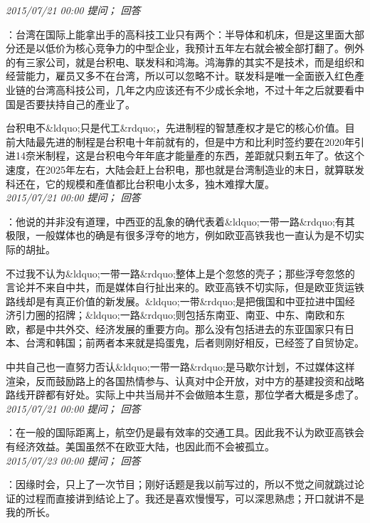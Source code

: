 \documentclass[twocolumn]{ctexart}
\begin{document}
\textit{\hfill\noindent\small 2015/07/21 00:00 提问； 回答}

：台湾在国际上能拿出手的高科技工业只有两个：半导体和机床，但是这里面大部分还是以低价为核心竞争力的中型企业，我预计五年左右就会被全部打翻了。例外的有三家公司，就是台积电、联发科和鸿海。鸿海靠的其实不是技术，而是组织和经营能力，雇员又多不在台湾，所以可以忽略不计。联发科是唯一全面嵌入红色產业链的台湾高科技公司，几年之内应该还有不少成长余地，不过十年之后就要看中国是否要扶持自己的產业了。

台积电不\&ldquo;只是代工\&rdquo;，先进制程的智慧產权才是它的核心价值。目前大陆最先进的制程是台积电十年前就有的，但是中方和比利时签约要在2020年引进14奈米制程，这是台积电今年年底才能量產的东西，差距就只剩五年了。依这个速度，在2025年左右，大陆会赶上台积电，那也就是台湾制造业的末日，就算联发科还在，它的规模和產值都比台积电小太多，独木难撑大厦。\\

\textit{\hfill\noindent\small 2015/07/21 00:00 提问； 回答}

：他说的并非没有道理，中西亚的乱象的确代表着\&ldquo;一带一路\&rdquo;有其极限，一般媒体也的确是有很多浮夸的地方，例如欧亚高铁我也一直认为是不切实际的胡扯。

不过我不认为\&ldquo;一带一路\&rdquo;整体上是个忽悠的壳子；那些浮夸忽悠的言论并不来自中共，而是媒体自行扯出来的。欧亚高铁不切实际，但是欧亚货运铁路线却是有真正价值的新发展。\&ldquo;一带\&rdquo;是把俄国和中亚拉进中国经济引力圈的招牌；\&ldquo;一路\&rdquo;则包括东南亚、南亚、中东、南欧和东欧，都是中共外交、经济发展的重要方向。那么没有包括进去的东亚国家只有日本、台湾和韩国；前两者本来就是捣蛋鬼，后者则刚好相反，已经签了自贸协定。

中共自己也一直努力否认\&ldquo;一带一路\&rdquo;是马歇尔计划，不过媒体这样渲染，反而鼓励路上的各国热情参与、认真对中企开放，对中方的基建投资和战略路线开辟都有好处。实际上中共当局并不会做赔本生意，那位学者大概是多虑了。\\

\textit{\hfill\noindent\small 2015/07/21 00:00 提问； 回答}

：在一般的国际距离上，航空仍是最有效率的交通工具。因此我不认为欧亚高铁会有经济效益。美国虽然不在欧亚大陆，也因此而不会被孤立。\\

\textit{\hfill\noindent\small 2015/07/23 00:00 提问； 回答}

：因缘时会，只上了一次节目；刚好话题是我以前写过的，所以不觉之间就跳过论证的过程而直接讲到结论上了。我还是喜欢慢慢写，可以深思熟虑；开口就讲不是我的所长。\\
\end{document}

